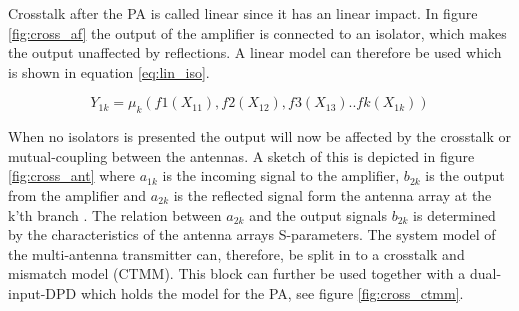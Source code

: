 Crosstalk after the PA is called linear since it has an linear impact. In figure \ref{fig:cross_af} the output of the amplifier is connected to an isolator, which makes the output unaffected by reflections. A linear model can therefore be used which is shown in equation \ref{eq:lin_iso}. 

\begin{equation} \label{eq:lin_iso}
Y_{1k} = \mu_k(f1(X_{11}),f2(X_{12}),f3(X_{13})..fk(X_{1k}))
\end{equation}     

When no isolators is presented the output will now be affected by the crosstalk or mutual-coupling between the antennas. A sketch of this is depicted in figure \ref{fig:cross_ant} where $a_{1k}$ is the incoming signal to the amplifier, $b_{2k}$ is the output from the amplifier and $a_{2k}$ is the reflected signal form the antenna array at the k'th branch \citep{Hausmair2017}. The relation between $a_{2k}$
and the output signals $b_{2k}$ is determined by the characteristics
of the antenna arrays S-parameters. The system model of the multi-antenna
transmitter can, therefore, be split in to a crosstalk and
mismatch model (CTMM). This block can further be used together with a dual-input-DPD which holds the model for the PA, see figure \ref{fig:cross_ctmm}. 


